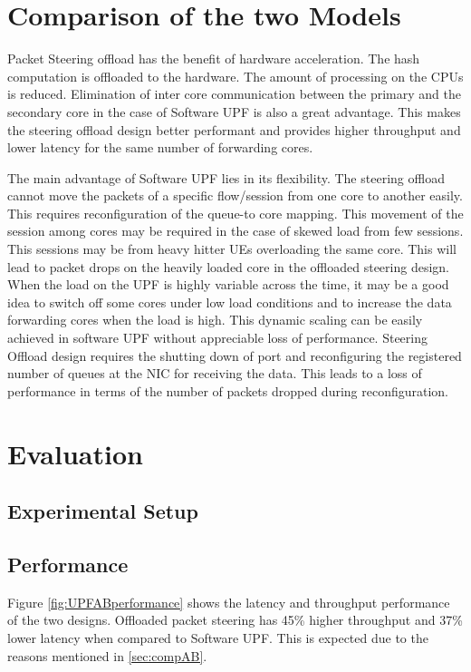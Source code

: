 \section{Comparison of the two Models \label{sec:compAB}}
Packet Steering offload has the benefit of hardware acceleration. The hash computation is offloaded to the hardware. The amount of processing on the CPUs is reduced. Elimination of inter core communication between the primary and the secondary core in the case of Software UPF is also a great advantage. This makes the steering offload design better performant and provides higher throughput and lower latency for the same number of forwarding cores.

The main advantage of Software UPF lies in its flexibility. The steering offload cannot move the packets of a specific flow/session from one core to another easily. This requires reconfiguration of the queue-to core mapping.
This movement of the session among cores may be required in the case of skewed load from few sessions. This sessions may be from heavy hitter UEs overloading the same core. This will lead to packet drops on the heavily loaded core in the offloaded steering design.
When the load on the UPF is highly variable across the time, it may be a good idea to switch off some cores under low load conditions and to increase the data
forwarding cores when the load is high. This dynamic scaling can be easily
achieved in software UPF without appreciable loss of performance. Steering Offload design requires the shutting down of port and reconfiguring the registered number of queues at the NIC for receiving the data. This leads to a loss of performance in terms of the number of packets dropped during reconfiguration.

\section{Evaluation}
\subsection{Experimental Setup}
\subsection{Performance}
Figure \ref{fig:UPFABperformance} shows the latency and throughput performance of the two designs.
 Offloaded packet steering has 45\% higher throughput and 37\% lower latency when compared to Software UPF. This is expected due to the reasons mentioned in \ref{sec:compAB}. 
